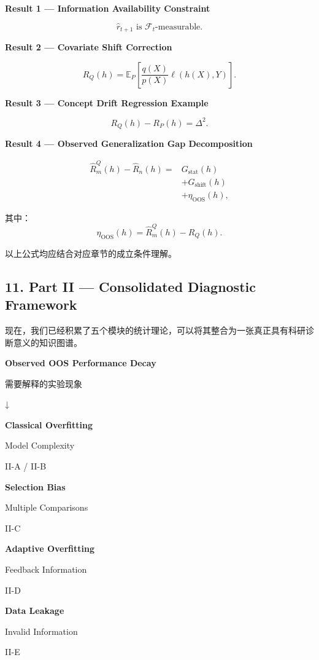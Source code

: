 \textbf{Result 1 --- Information Availability Constraint}

\[\hat r_{t+1}\text{ is }\mathcal F_t\text{-measurable}.\]

\textbf{Result 2 --- Covariate Shift Correction}

\[R_Q(h)
=
\mathbb E_P
\left[
\frac{q(X)}{p(X)}
\ell(h(X),Y)
\right].\]

\textbf{Result 3 --- Concept Drift Regression Example}

\[R_Q(h)-R_P(h)=\Delta^2.\]

\textbf{Result 4 --- Observed Generalization Gap Decomposition}

\[\boxed{
\begin{aligned}
\widehat R_m^Q(h)-\widehat R_n(h)
={}&G_{\mathrm{stat}}(h)\\
&+G_{\mathrm{shift}}(h)\\
&+\eta_{\mathrm{OOS}}(h),
\end{aligned}
}\]

其中：
\[\eta_{\mathrm{OOS}}(h)
=
\widehat R_m^Q(h)-R_Q(h).\]

以上公式均应结合对应章节的成立条件理解。

\hypertarget{part-2-23-0001-part-ii-consolidated-diagnostic-framework}{%
\subsection{11. Part II --- Consolidated Diagnostic Framework}\label{part-2-23-0001-part-ii-consolidated-diagnostic-framework}}

现在，我们已经积累了五个模块的统计理论，可以将其整合为一张真正具有科研诊断意义的知识图谱。

\textbf{Observed OOS Performance Decay}

需要解释的实验现象

↓

\textbf{Classical Overfitting}

Model Complexity

II-A / II-B

\textbf{Selection Bias}

Multiple Comparisons

II-C

\textbf{Adaptive Overfitting}

Feedback Information

II-D

\textbf{Data Leakage}

Invalid Information

II-E

